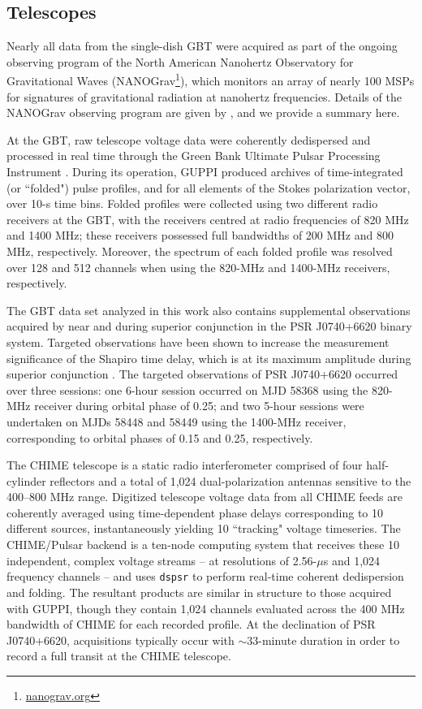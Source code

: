 \documentclass[twocolumn]{aastex63}
\begin{document}
\subsection{Telescopes}
Nearly all data from the single-dish GBT were acquired as part of the ongoing observing program of the North American Nanohertz Observatory for Gravitational Waves (NANOGrav\footnote{\href{http://nanograv.org}{nanograv.org}}), which monitors an array of nearly 100 MSPs for signatures of gravitational radiation at nanohertz frequencies. Details of the NANOGrav observing program are given by \citet{aab+21a,aab+21b}, and we provide a summary here.

At the GBT, raw telescope voltage data were coherently dedispersed and processed in real time through the Green Bank Ultimate Pulsar Processing Instrument \citep[GUPPI;][]{drd+08}. During its operation, GUPPI produced archives of time-integrated (or ``folded") pulse profiles, and for all elements of the Stokes polarization vector, over 10-s time bins. Folded profiles were collected using two different radio receivers at the GBT, with the receivers centred at radio frequencies of 820 MHz and 1400 MHz; these receivers possessed full bandwidths of 200 MHz and 800 MHz, respectively. Moreover, the spectrum of each folded profile was resolved over 128 and 512 channels when using the 820-MHz and 1400-MHz receivers, respectively. 

The GBT data set analyzed in this work also contains supplemental observations acquired by \citet{cfr+20} near and during superior conjunction in the PSR J0740+6620 binary system. Targeted observations have been shown to increase the measurement significance of the Shapiro time delay, which is at its maximum amplitude during superior conjunction \citep[orbital phase of 0.25, relative to the ascending node; e.g.,][]{dpr+10,pen15}. The targeted observations of PSR J0740+6620 occurred over three sessions: one 6-hour session occurred on MJD 58368 using the 820-MHz receiver during orbital phase of 0.25; and two 5-hour sessions were undertaken on MJDs 58448 and 58449 using the 1400-MHz receiver, corresponding to orbital phases of 0.15 and 0.25, respectively.

The CHIME telescope is a static radio interferometer comprised of four half-cylinder reflectors and a total of 1,024 dual-polarization antennas sensitive to the 400--800 MHz range. Digitized telescope voltage data from all CHIME feeds are coherently averaged using time-dependent phase delays corresponding to 10 different sources, instantaneously yielding 10 ``tracking" voltage timeseries. The CHIME/Pulsar backend \citep{abb+20} is a ten-node computing system that receives these 10 independent, complex voltage streams -- at resolutions of 2.56-$\mu$s and 1,024 frequency channels -- and uses {\tt dspsr} \citep{vb11} to perform real-time coherent dedispersion and folding. The resultant products are similar in structure to those acquired with GUPPI, though they contain 1,024 channels evaluated across the 400 MHz bandwidth of CHIME for each recorded profile. At the declination of PSR J0740+6620, acquisitions typically occur with $\sim 33$-minute duration in order to record a full transit at the CHIME telescope.
\end{document}
